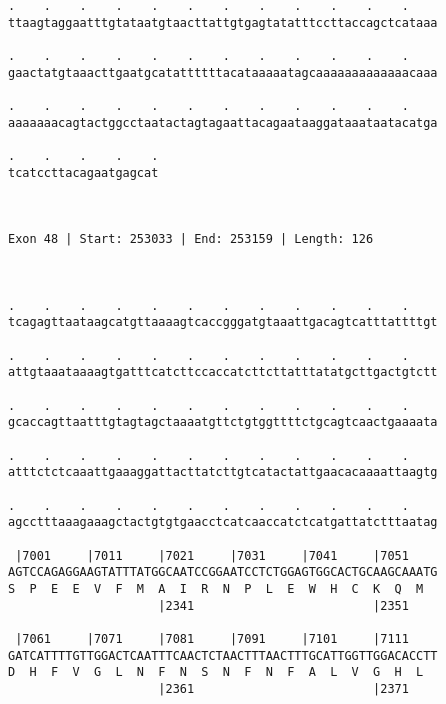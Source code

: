 \documentclass{article}
\begin{document}
\begin{Verbatim}
.    .    .    .    .    .    .    .    .    .    .    .    
ttaagtaggaatttgtataatgtaacttattgtgagtatatttccttaccagctcataaa
                                                            
.    .    .    .    .    .    .    .    .    .    .    .    
gaactatgtaaacttgaatgcatattttttacataaaaatagcaaaaaaaaaaaaacaaa
                                                            
.    .    .    .    .    .    .    .    .    .    .    .    
aaaaaaacagtactggcctaatactagtagaattacagaataaggataaataatacatga
                                                            
.    .    .    .    .
tcatccttacagaatgagcat
                     
                     
 
Exon 48 | Start: 253033 | End: 253159 | Length: 126



.    .    .    .    .    .    .    .    .    .    .    .    
tcagagttaataagcatgttaaaagtcaccgggatgtaaattgacagtcatttattttgt
                                                            
.    .    .    .    .    .    .    .    .    .    .    .    
attgtaaataaaagtgatttcatcttccaccatcttcttatttatatgcttgactgtctt
                                                            
.    .    .    .    .    .    .    .    .    .    .    .    
gcaccagttaatttgtagtagctaaaatgttctgtggttttctgcagtcaactgaaaata
                                                            
.    .    .    .    .    .    .    .    .    .    .    .    
atttctctcaaattgaaaggattacttatcttgtcatactattgaacacaaaattaagtg
                                                            
.    .    .    .    .    .    .    .    .    .    .    .    
agcctttaaagaaagctactgtgtgaacctcatcaaccatctcatgattatctttaatag
                                                            
 |7001     |7011     |7021     |7031     |7041     |7051    
AGTCCAGAGGAAGTATTTATGGCAATCCGGAATCCTCTGGAGTGGCACTGCAAGCAAATG
S  P  E  E  V  F  M  A  I  R  N  P  L  E  W  H  C  K  Q  M  
                     |2341                         |2351    
  
 |7061     |7071     |7081     |7091     |7101     |7111    
GATCATTTTGTTGGACTCAATTTCAACTCTAACTTTAACTTTGCATTGGTTGGACACCTT
D  H  F  V  G  L  N  F  N  S  N  F  N  F  A  L  V  G  H  L  
                     |2361                         |2371    
  

\end{Verbatim}
\end{document}
